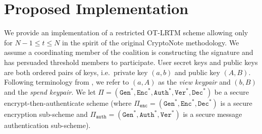 \documentclass{mrl}
\theoremstyle{definition}
\begin{document}
\section{Proposed Implementation}\label{sec:implement}

We provide an implementation of a restricted OT-LRTM scheme allowing only for $N-1 \leq t \leq N$ in the spirit of the original CryptoNote methodology. We assume a coordinating member of the coalition is constructing the signature and has persuaded threshold members to participate. User secret keys and public keys are both ordered pairs of keys, i.e.\ private key $(a,b)$ and public key $(A,B)$. Following terminology from \cite{van2013cryptonote}, we refer to $(a,A)$ as the \textit{view keypair} and $(b,B)$ and the \textit{spend keypair}.  We let $\Pi = (\texttt{Gen}^*,\texttt{Enc}^*, \texttt{Auth}^*, \texttt{Ver}^*, \texttt{Dec}^*)$ be a secure encrypt-then-authenticate scheme (where $\Pi_{\texttt{enc}} = (\texttt{Gen}^*,\texttt{Enc}^*, \texttt{Dec}^*)$ is a secure encryption sub-scheme and $\Pi_{\texttt{auth}} = (\texttt{Gen}^*,\texttt{Auth}^*, \texttt{Ver}^*)$ is a secure message authentication sub-scheme). %
\end{document}
